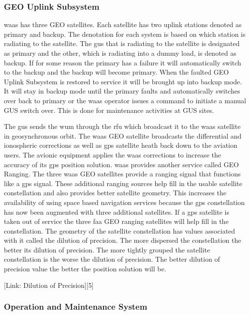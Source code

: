 \subsubsection{GEO Uplink Subsystem}\label{geo-uplink-subsystem}

\ac{waas} has three GEO satellites. Each satellite has two uplink stations
denoted as primary and backup. The denotation for each system is based
on which station is radiating to the satellite. The \ac{gus}
that is radiating to the satellite is designated as primary and the
other, which is radiating into a dummy load, is denoted as backup. If
for some reason the primary has a failure it will automatically switch
to the backup and the backup will become primary. When the faulted GEO
Uplink Subsystem is restored to service it will be brought up into
backup mode. It will stay in backup mode until the primary faults and
automatically switches over back to primary or the \ac{waas} operator issues
a command to initiate a manual GUS switch over. This is done for
maintenance activities at GUS sites.

The \ac{gus} sends the \ac{wum} through the \ac{rfu} which broadcast it to the \ac{waas} satellite in
geosynchronous orbit. The \ac{waas} GEO satellite broadcasts the differential
and ionospheric corrections as well as \ac{gps} satellite heath back down to
the aviation users. The avionic equipment applies the \ac{waas} corrections
to increase the accuracy of its \ac{gps} position solution. \ac{waas} provides
another service called GEO Ranging. The three \ac{waas} GEO satellites
provide a ranging signal that functions like a \ac{gps} signal. These
additional ranging sources help fill in the usable satellite
constellation and also provides better satellite geometry. This
increases the availability of using space based navigation services
because the \ac{gps} constellation has now been augmented with three
additional satellites. If a \ac{gps} satellite is taken out of service the
three \ac{faa} GEO ranging satellites will help fill in the constellation.
The geometry of the satellite constellation has values associated with
it called the dilution of precision. The more dispersed the
constellation the better its dilution of precision. The more tightly
grouped the satellite constellation is the worse the dilution of
precision. The better dilution of precision value the better the
position solution will be.

{[}Link: Dilution of Precision{]}{[}5{]}

\subsubsection{Operation and Maintenance
System}\label{operation-and-maintenance-system}

